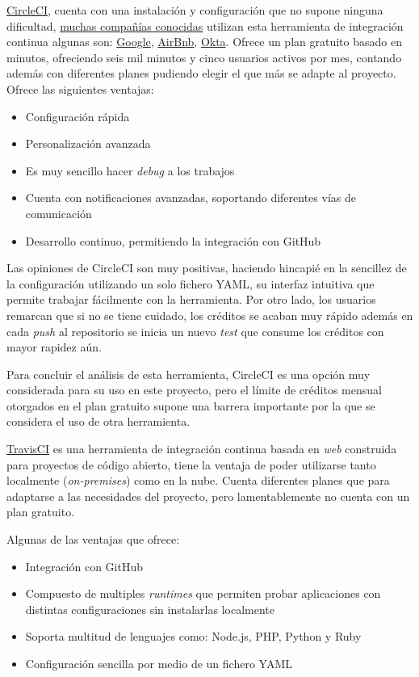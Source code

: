 \href{https://circleci.com/}{CircleCI}, cuenta con una instalación y configuración que no supone ninguna dificultad, \href{https://circleci.com/customers/}{muchas compañías conocidas} utilizan esta herramienta de integración continua algunas son: \href{https://www.google.com/}{Google}, \href{https://www.airbnb.es/}{AirBnb}, \href{https://www.okta.com/}{Okta}. Ofrece un plan gratuito basado en minutos, ofreciendo seis mil minutos y cinco usuarios activos por mes, contando además con diferentes planes pudiendo elegir el que más se adapte al proyecto. Ofrece las siguientes ventajas: \cite{polkhovskiy2016comparison}
\begin{itemize}
    \item Configuración rápida
    \item Personalización avanzada
    \item Es muy sencillo hacer \emph{debug} a los trabajos
    \item Cuenta con notificaciones avanzadas, soportando diferentes vías de comunicación
    \item Desarrollo continuo, permitiendo la integración con GitHub
\end{itemize}

Las opiniones de CircleCI son muy positivas, haciendo hincapié en la sencillez de la configuración utilizando un solo fichero YAML, su interfaz intuitiva que permite trabajar fácilmente con la herramienta. Por otro lado, los usuarios remarcan que si no se tiene cuidado, los créditos se acaban muy rápido además en cada \emph{push} al repositorio se inicia un nuevo \emph{test} que consume los créditos con mayor rapidez aún. \cite{CircleCI2023}

Para concluir el análisis de esta herramienta, CircleCI es una opción muy considerada para su uso en este proyecto, pero el límite de créditos mensual otorgados en el plan gratuito supone una barrera importante por la que se considera el uso de otra herramienta.

\href{https://www.travis-ci.com/}{TravisCI} es una herramienta de integración continua basada en \emph{web} construida para proyectos de código abierto, tiene la ventaja de poder utilizarse tanto localmente (\emph{on-premises}) como en la nube. Cuenta diferentes planes que para adaptarse a las necesidades del proyecto, pero lamentablemente no cuenta con un plan gratuito. 

Algunas de las ventajas que ofrece:
\begin{itemize}
    \item Integración con GitHub
    \item Compuesto de multiples \emph{runtimes} que permiten probar aplicaciones con distintas configuraciones sin instalarlas localmente
    \item Soporta multitud de lenguajes como: Node.js, PHP, Python y Ruby
    \item Configuración sencilla por medio de un fichero YAML
\end{itemize}

